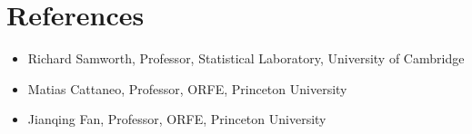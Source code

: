 \documentclass{wgu-cv}
\begin{document}
\section{References}
\vspace{-0.22cm}

\begin{itemize}

  \item
    Richard Samworth,
    Professor,
    Statistical Laboratory,
    University of Cambridge

  \item
    Matias Cattaneo,
    Professor,
    ORFE,
    Princeton University


  \item
    Jianqing Fan,
    Professor,
    ORFE,
    Princeton University

\end{itemize}
\end{document}
